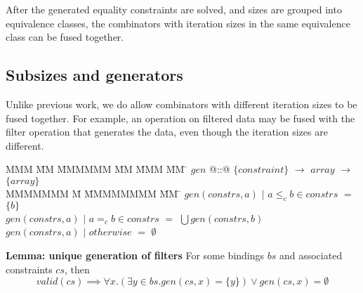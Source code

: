 After the generated equality constraints are solved, and sizes are grouped into equivalence classes, the combinators with iteration sizes in the same equivalence class can be fused together.

\subsection{Subsizes and generators}
Unlike previous work, we do allow combinators with different iteration sizes to be fused together.
For example, an operation on filtered data may be fused with the filter operation that generates the data, even though the iteration sizes are different.



\begin{tabbing}
MMM       \= MM \= MMMMMM \= MM \= MMM \= MM \= \kill
$gen$   \> @::@  \> $\{constraint\}$  \> $\to$ \> $array$ \> $\to$ \> $\{array\}$ \\
MMMMMMM                 \= M  \= MMMMMMMM \= MM \= \kill
$gen(constrs, a)$ \> $|$ \> $a \le_c b \in constrs$ \> $=$ \> $\{b\}$                        \\
$gen(constrs, a)$ \> $|$ \> $a =_c b \in constrs$   \> $=$ \> $\bigcup gen(constrs, b)$                        \\
$gen(constrs, a)$ \> $|$ \> $otherwise$             \> $=$ \> $\emptyset$                        \\
\end{tabbing}

\textbf{Lemma: unique generation of filters}
For some bindings $bs$ and associated constraints $cs$, then
\[
valid(cs) \implies \forall x. (\exists y \in bs. gen(cs, x) = \{y\}) \vee gen(cs, x) = \emptyset
\]

